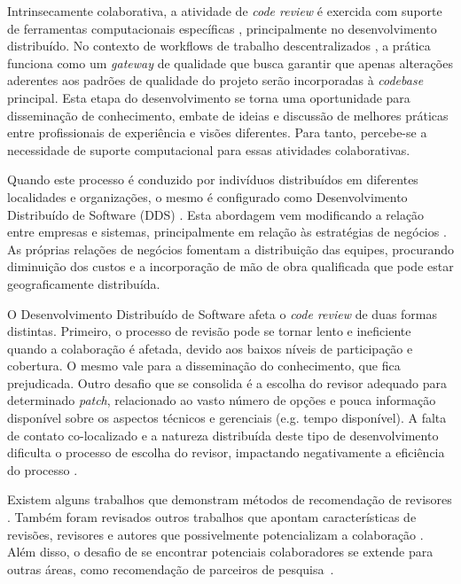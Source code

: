 \documentclass[peerreview]{acmart}
\begin{document}
Intrinsecamente colaborativa, a atividade de \textit{code review} é exercida com suporte de ferramentas computacionais específicas \cite{Bacchelli2013}, principalmente no desenvolvimento distribuído. No contexto de workflows de trabalho descentralizados \cite{gousios2016}, a prática funciona como um \textit{gateway} de qualidade que busca garantir que apenas alterações aderentes aos padrões de qualidade do projeto serão incorporadas à \textit{codebase} principal. Esta etapa do desenvolvimento se torna uma oportunidade para disseminação de conhecimento, embate de ideias e discussão de melhores práticas entre profissionais de experiência e visões diferentes. Para tanto, percebe-se a necessidade de suporte computacional para essas atividades colaborativas.

Quando este processo é conduzido por indivíduos distribuídos em diferentes localidades e organizações, o mesmo é configurado como Desenvolvimento Distribuído de Software (DDS) \cite{herbsleb2003}. Esta abordagem vem modificando a relação entre empresas e sistemas, principalmente em relação às estratégias de negócios \cite{audy2007}. As próprias relações de negócios fomentam a distribuição das equipes, procurando diminuição dos custos e a incorporação de mão de obra qualificada que pode estar geograficamente distribuída.

O Desenvolvimento Distribuído de Software afeta o \textit{code review} de duas formas distintas. Primeiro, o processo de revisão pode se tornar lento e ineficiente quando a colaboração é afetada, devido aos baixos níveis de participação e cobertura. O mesmo vale para a disseminação do conhecimento, que fica prejudicada. Outro desafio que se consolida é a escolha do revisor adequado para determinado \textit{patch}, relacionado ao vasto número de opções e pouca informação disponível sobre os aspectos técnicos e gerenciais (e.g. tempo disponível). A falta de contato co-localizado e a natureza distribuída deste tipo de desenvolvimento dificulta o processo de escolha do revisor, impactando negativamente a eficiência do processo \cite{Thongtanunam2015-1}.

Existem alguns trabalhos que demonstram métodos de recomendação de revisores \cite{yu2014,jiang2017}. Também foram revisados outros trabalhos que apontam características de revisões, revisores e autores que possivelmente potencializam a colaboração \cite{Kemerer2009,Bird2015191}. Além disso, o desafio de se encontrar potenciais colaboradores se extende para outras áreas, como recomendação de parceiros de pesquisa~\cite{digiampietri2015}.
\end{document}
